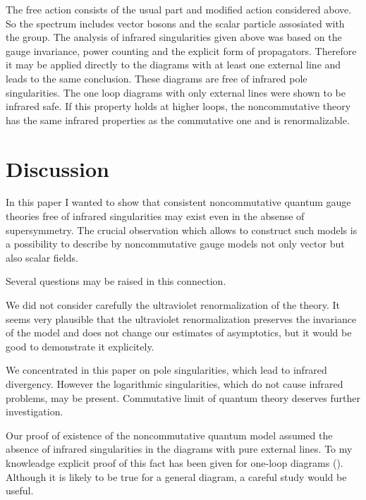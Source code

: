 \documentclass[a4paper,12pt]{article}
\begin{document}
 The free action consists of the usual \coordHE{} part and modified \coordHE{} 
 action considered above. So the spectrum includes vector \coordHE{} bosons 
and the scalar particle assosiated with the \coordHE{} group. The analysis of 
infrared singularities given above was based on the gauge invariance, 
power counting and the explicit form of \coordHE{} propagators. Therefore 
it may be applied directly to the diagrams with at least one 
external \coordHE{} line and leads to the same conclusion. These diagrams are 
free of infrared pole singularities. The one loop diagrams with only 
\coordHE{} external lines were shown to be infrared safe. If this 
property holds at higher loops, the noncommutative \coordHE{} theory has the 
same infrared properties as the commutative one and is renormalizable. 
 
\section{Discussion}

In this paper I wanted to show that consistent 
 noncommutative quantum gauge theories free of infrared singularities may 
 exist even in the absense of supersymmetry.  The crucial observation 
 which allows to construct such models is a possibility to describe by 
  noncommutative gauge models not only vector but also scalar fields. 
 
Several questions may be raised in this connection. 
 
 We did not 
 consider carefully the ultraviolet renormalization of the theory. 
 It seems very plausible that the ultraviolet 
 renormalization preserves the invariance of the model and does not 
 change our estimates of asymptotics, but it would be good to demonstrate 
 it explicitely.
 
 We concentrated in this paper on pole singularities, which lead to 
 infrared divergency. However the logarithmic singularities, which do not 
 cause infrared problems, may be present. Commutative limit of 
 quantum theory deserves further investigation.
 
 Our proof of existence of the noncommutative quantum \coordHE{} model 
  assumed the absence of infrared singularities in the diagrams with 
  pure \coordHE{} external lines. To my knowleadge explicit proof of this 
  fact has been given for one-loop diagrams (\cite{AA}). Although it is 
  likely to be true for a general diagram, a careful study 
  would be useful.
  
\end{document}
